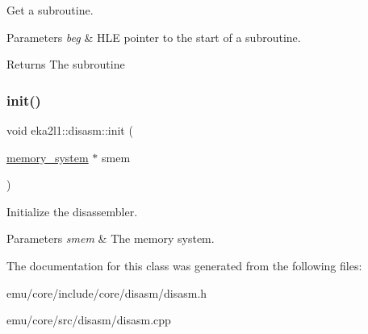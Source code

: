 Get a subroutine. 


\begin{DoxyParams}{Parameters}
{\em beg} & H\+LE pointer to the start of a subroutine. \\
\hline
\end{DoxyParams}
\begin{DoxyReturn}{Returns}
The subroutine 
\end{DoxyReturn}
\mbox{\label{classeka2l1_1_1disasm_a0911b390a5f620597b6a2c4ed6ca0a2f}} 
\subsubsection{\texorpdfstring{init()}{init()}}
{\footnotesize\ttfamily void eka2l1\+::disasm\+::init (\begin{DoxyParamCaption}\item[{\mbox{\hyperlink{classeka2l1_1_1memory__system}{memory\+\_\+system}} $\ast$}]{smem }\end{DoxyParamCaption})}



Initialize the disassembler. 


\begin{DoxyParams}{Parameters}
{\em smem} & The memory system. \\
\hline
\end{DoxyParams}


The documentation for this class was generated from the following files\+:\begin{DoxyCompactItemize}
\item 
emu/core/include/core/disasm/disasm.\+h\item 
emu/core/src/disasm/disasm.\+cpp\end{DoxyCompactItemize}
